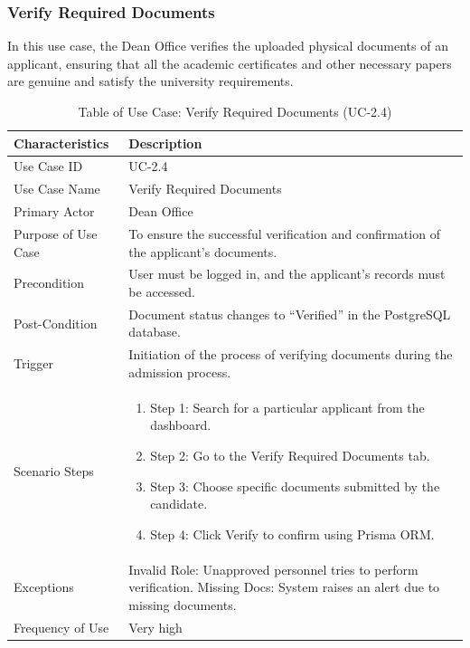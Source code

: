 \subsubsection{Verify Required Documents}

In this use case, the Dean Office verifies the uploaded physical documents of an applicant, ensuring that all the academic certificates and other necessary papers are genuine and satisfy the university requirements.

\begin{table}[H]
    \centering
    \small
    \renewcommand{\arraystretch}{1.4}
    \caption{Table of Use Case: Verify Required Documents (UC-2.4)}
    \label{tab:dean_verify_docs}
    
    \begin{tabularx}{\textwidth}{|l|X|}
        \hline
        \rowcolor[gray]{0.9} {Characteristics} & {Description} \\ \hline
        Use Case ID & UC-2.4 \\ \hline
        Use Case Name & Verify Required Documents \\ \hline
        Primary Actor & Dean Office \\ \hline
        Purpose of Use Case & To ensure the successful verification and confirmation of the applicant’s documents. \\ \hline
        Precondition & User must be logged in, and the applicant’s records must be accessed. \\ \hline
        Post-Condition & Document status changes to “Verified” in the PostgreSQL database. \\ \hline
        Trigger & Initiation of the process of verifying documents during the admission process. \\ \hline
        Scenario Steps & 
        \begin{enumerate}[nosep, leftmargin=*]
            \item Step 1: Search for a particular applicant from the dashboard.
            \item Step 2: Go to the Verify Required Documents tab.
            \item Step 3: Choose specific documents submitted by the candidate.
            \item Step 4: Click Verify to confirm using Prisma ORM.
        \end{enumerate} \\ \hline
        Exceptions & Invalid Role: Unapproved personnel tries to perform verification. Missing Docs: System raises an alert due to missing documents. \\ \hline
        Frequency of Use & Very high \\ \hline
    \end{tabularx}
\end{table}
\FloatBarrier